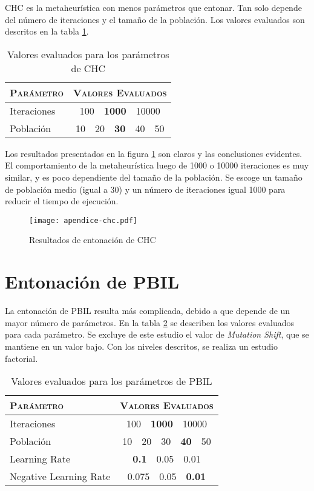 CHC es la metaheurística con menos parámetros que entonar. Tan solo depende del número de iteraciones y el tamaño de la población. Los valores evaluados son descritos en la tabla \ref{table-ap-chc}.

\begin{table}[h!]
\centering
\begin{tabular}{l c}
\hline
\textsc{Parámetro} & \textsc{Valores Evaluados} \\
\hline
\hline
Iteraciones & 100\ \ \textbf{1000}\ \ 10000 \\
Población   & 10\ \ 20\ \ \textbf{30}\ \ 40\ \ 50 \\
\hline
\end{tabular}
\caption{Valores evaluados para los parámetros de CHC}
\label{table-ap-chc}
\end{table}

Los resultados presentados en la figura \ref{fig-ap-chc} son claros y las conclusiones evidentes. El comportamiento de la metaheurística luego de 1000 o 10000 iteraciones es muy similar, y es poco dependiente del tamaño de la población. Se escoge un tamaño de población medio (igual a 30) y un número de iteraciones igual 1000 para reducir el tiempo de ejecución.

\begin{figure}[h!]
\centering
\texttt{[image: apendice-chc.pdf]}
\caption{Resultados de entonación de CHC}
\label{fig-ap-chc}
\end{figure}

\section{Entonación de PBIL}

La entonación de PBIL resulta más complicada, debido a que depende de un mayor número de parámetros. En la tabla \ref{table-ap-pbil} se describen los valores evaluados para cada parámetro. Se excluye de este estudio el valor de \emph{Mutation Shift}, que se mantiene en un valor bajo. Con los niveles descritos, se realiza un estudio factorial.

\begin{table}[h!]
\centering
\begin{tabular}{l c}
\hline
\textsc{Parámetro} & \textsc{Valores Evaluados} \\
\hline
\hline
Iteraciones & 100\ \ \textbf{1000}\ \ 10000 \\
Población   & 10\ \ 20\ \ 30\ \ \textbf{40}\ \ 50 \\
Learning Rate & \textbf{0.1}\ \ 0.05\ \ 0.01 \\
Negative Learning Rate & 0.075\ \ 0.05\ \ \textbf{0.01} \\
\hline
\end{tabular}
\caption{Valores evaluados para los parámetros de PBIL}
\label{table-ap-pbil}
\end{table}

